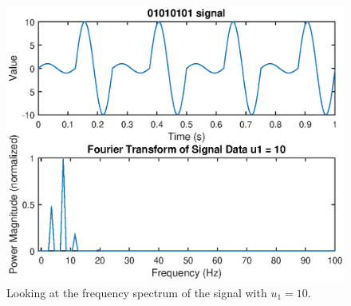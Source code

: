 \documentclass[11pt]{article}
\begin{document}
\begin{figure}[H]
	\centering
	\includegraphics[width=1\textwidth]{../ex2/fftU1-10}
	\caption{Looking at the frequency spectrum of the signal with $u_1 = 10$.}
	\label{fig:fftU1-10}
\end{figure}
\end{document}
